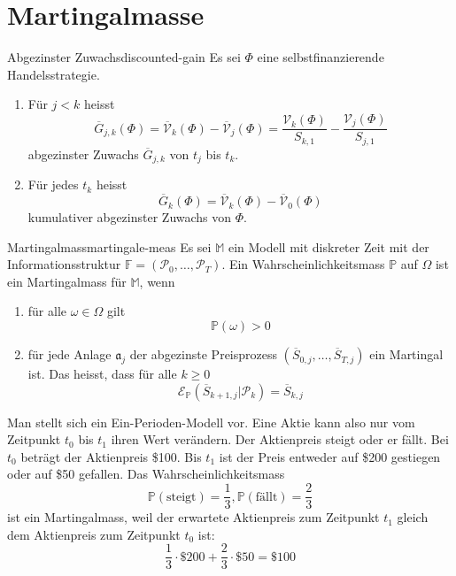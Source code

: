 \documentclass[11pt]{report} %
\begin{document}
\section{Martingalmasse}
\begin{Definition}{Abgezinster Zuwachs}{discounted-gain}
    Es sei $\Phi$ eine selbstfinanzierende Handelsstrategie. 
    \begin{enumerate}
        \item Für $j<k$ heisst $$\overline{G}_{j, k}(\Phi)=\overline{\mathcal{V}}_k(\Phi)-\overline{\mathcal{V}}_j(\Phi)=\frac{\mathcal{V}_k(\Phi)}{S_{k, 1}}-\frac{\mathcal{V}_j(\Phi)}{S_{j, 1}}$$ abgezinster Zuwachs $\overline{G}_{j, k}$ von $t_j$ bis $t_k$.
        \item Für jedes $t_k$ heisst $$\overline{G}_{k}(\Phi)=\overline{\mathcal{V}}_k(\Phi)-\overline{\mathcal{V}}_0(\Phi)$$ kumulativer abgezinster Zuwachs von $\Phi$.
    \end{enumerate}
\end{Definition}
\begin{Definition}{Martingalmass}{martingale-meas}
    Es sei $\mathbb{M}$ ein Modell mit diskreter Zeit mit der Informationsstruktur $\mathbb{F}=(\mathcal{P}_0, \ldots, \mathcal{P}_T)$. Ein Wahrscheinlichkeitsmass $\mathbb{P}$ auf $\Omega$ ist ein Martingalmass für $\mathbb{M}$, wenn
    \begin{enumerate}
        \item für alle $\omega \in \Omega$ gilt $$\mathbb{P}(\omega)>0$$
        \item für jede Anlage $\mathfrak{a}_j$ der abgezinste Preisprozess $(\overline{S}_{0, j}, \ldots, \overline{S}_{T, j})$ ein Martingal ist. Das heisst, dass für alle $k\geq0$ $$\mathcal{E}_{\mathbb{P}}(\overline{S}_{k+1, j}|\mathcal{P}_{k})=\overline{S}_{k, j}$$
    \end{enumerate}
\end{Definition}
\begin{Beispiel}{}{}
    Man stellt sich ein Ein-Perioden-Modell vor. Eine Aktie kann also nur vom Zeitpunkt $t_0$ bis $t_1$ ihren Wert verändern. Der Aktienpreis steigt oder er fällt. Bei $t_0$ beträgt der Aktienpreis \$100. Bis $t_1$ ist der Preis entweder auf \$200 gestiegen oder auf \$50 gefallen. Das Wahrscheinlichkeitsmass $$\mathbb{P}(\text{steigt})=\frac{1}{3}, \mathbb{P}(\text{fällt})=\frac{2}{3}$$ ist ein Martingalmass, weil der erwartete Aktienpreis zum Zeitpunkt $t_1$ gleich dem Aktienpreis zum Zeitpunkt $t_0$ ist: $$\frac{1}{3}\cdot \$200 + \frac{2}{3}\cdot \$50=\$100$$
\end{Beispiel}
\end{document}
